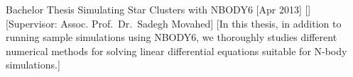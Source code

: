 \begin{cvsection}{Bachelor Thesis}
    \cvitem
    {Simulating Star Clusters with NBODY6}
    [Apr 2013]
    [\SBU]
    [Supervisor: Assoc. Prof.\ Dr.\ Sadegh Movahed]
    [In this thesis, in addition to running sample simulations using NBODY6, we thoroughly studies different numerical methods for solving linear differential equations suitable for N-body simulations.]
\end{cvsection}